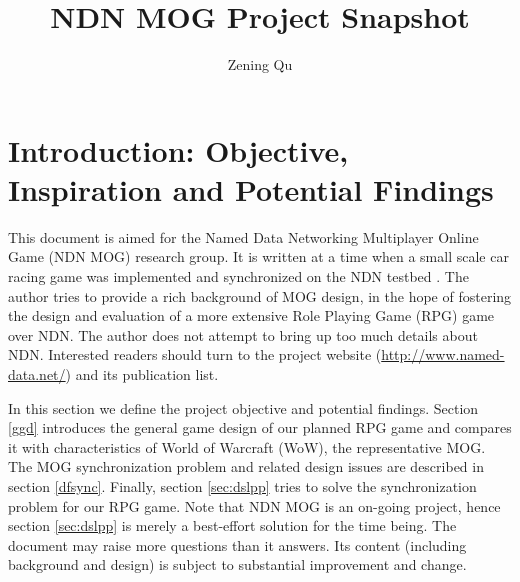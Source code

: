 \documentclass{article}
\begin{document}
\title{NDN MOG Project Snapshot}
\author{Zening Qu}
\maketitle

\tableofcontents

\listoffigures
\newpage

\section{Introduction: Objective, Inspiration and Potential Findings}
\label{itro}


This document is aimed for the Named Data Networking Multiplayer Online Game (NDN MOG) research group. It is written at a time when a small scale car racing game was implemented and synchronized on the NDN testbed \cite{egalcar}. The author tries to provide a rich background of MOG design, in the hope of fostering the design and evaluation of a more extensive Role Playing Game (RPG) game over NDN. The author does not attempt to bring up too much details about NDN. Interested readers should turn to the project website (\href{http://www.named-data.net/}{http://www.named-data.net/}) and its publication list.

In this section we define the project objective and potential findings. Section \ref{ggd} introduces the general game design of our planned RPG game and compares it with characteristics of World of Warcraft (WoW), the representative MOG. The MOG synchronization problem and related design issues are described in section \ref{dfsync}. Finally, section \ref{sec:dslpp} tries to solve the synchronization problem for our RPG game. Note that NDN MOG is an on-going project, hence section \ref{sec:dslpp} is merely a best-effort solution for the time being. The document may raise more questions than it answers. Its content (including background and design) is subject to substantial improvement and change.
\end{document}
